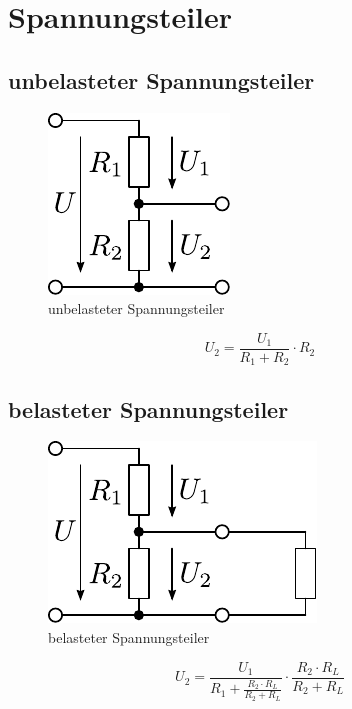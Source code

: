 



\section{Spannungsteiler}

\subsection{unbelasteter Spannungsteiler}
\begin{figure}[h!]
	\centering
	\includegraphics[scale=\schscale]{uteil.pdf}
	\caption{unbelasteter Spannungsteiler}
	\label{sch:uteil}
\end{figure}
\[ U_2 = \frac{U_1}{R_1 + R_2} \cdot R_2 \]

\subsection{belasteter Spannungsteiler}
\begin{figure}[h!]
	\centering
	\includegraphics[scale=\schscale]{uteilbel.pdf}
	\caption{belasteter Spannungsteiler}
	\label{sch:uteilbel}
\end{figure}
\[ U_2 = \frac{U_1}{R_1 + \frac{R_2 \cdot R_L}{R_2 + R_L}} \cdot \frac{R_2 \cdot R_L}{R_2 + R_L} \]

